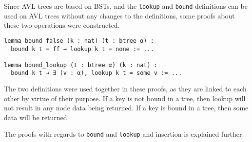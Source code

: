 Since AVL trees are based on BSTs, and the \lstinline{lookup} and \lstinline{bound} definitions can be used on AVL trees without any changes to the definitions, some proofs about these two operations were constructed.

\begin{lstlisting}
lemma bound_false (k : nat) (t : btree α) :
  bound k t = ff → lookup k t = none := ...

lemma bound_lookup (t : btree α) (k : nat) :
  bound k t → ∃ (v : α), lookup k t = some v := ...
\end{lstlisting}

The two definitions were used together in these proofs, as they are linked to each other by virtue of their purpose. If a key is not bound in a tree, then lookup will not result in any node data being returned. If a key is bound in a tree, then some data will be returned.

The proofs with regards to \lstinline{bound} and \lstinline{lookup} and insertion is explained further. 